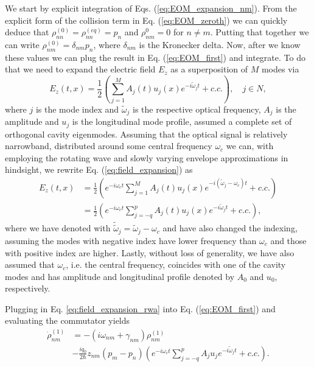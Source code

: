 \documentclass[preprint,secnumarabic,amssymb, nobibnotes, aip, prd]{revtex4-1}
\def\tw{\tilde{\omega}}
\def\tw{\tilde{\omega}}
\begin{document}
	We start by explicit integration of Eqs. (\ref{eq:EOM_expansion_nm}). From the explicit form of the collision term in Eq. (\ref{eq:EOM_zeroth}) we can quickly deduce that $\rho_{nn}^{(0)} = \rho_{nn}^{(eq)} = p_n$ and $\rho_{nm}^{0} = 0$ for $n\neq m$. Putting that together we can write $\rho_{nm}^{(0)} = \delta_{nm}p_n $, where $\delta_{nm}$ is the Kronecker delta. Now, after we know these values we can plug the result in Eq. (\ref{eq:EOM_first}) and integrate. To do that we need to expand the electric field $E_z$ as a superposition of $M$ modes via
	\begin{equation}
	\label{eq:field_expansion}
	E_z(t,x) = \frac{1}{2}(\sum_{j=1}^{M} A_j(t)u_j(x) e^{-i\tw_j t } + c.c.), \quad j \in N,
	\end{equation}
	where $j$ is the mode index and $\tw_j$  is the respective optical frequency, $A_j$ is the amplitude and $u_j$ is the longitudinal mode profile, assumed a complete set of orthogonal cavity eigenmodes. Assuming that the optical signal is relatively narrowband, distributed around some central frequency $\omega_c$ we can, with employing the rotating wave and slowly varying envelope approximations in hindsight, we rewrite Eq. (\ref{eq:field_expansion}) as 
	\begin{align}
	\label{eq:field_expansion_rwa}
	E_z(t,x) &= \frac{1}{2}(e^{-i\omega_c t}\sum_{j=1}^{M} A_j(t)u_j(x) e^{-i(\tw_j-\omega_c) t } + c.c.) \nonumber \\
	&= \frac{1}{2}(e^{-i\omega_c t}\sum_{j=-q}^{p} A_j(t)u_j(x) e^{-i\tw_j t } + c.c.), 
	\end{align}
	where we have denoted with $\tilde \tw_j = \tw_j-\omega_c$ and have also changed the indexing, assuming the modes with negative index have lower frequency than $\omega_c$ and those with positive index are higher. Lastly, without loss of generality, we have also assumed that $\omega_c$, i.e. the central frequency, coincides with one of the cavity modes and has amplitude and longitudinal profile denoted by $A_0$ and $u_0$, respectively.   
	
	Plugging in Eq. \ref{eq:field_expansion_rwa} into Eq. (\ref{eq:EOM_first}) and evaluating the commutator yields
	\begin{align}
	\label{eq:coherence_expansion}
	\dot{\rho}_{nm}^{(1)} &= -(i\omega_{nm}+\gamma_{nm})\rho_{nm}^{(1)}  \nonumber \\ 
	&- \frac{iq_0}{2\hbar}z_{nm}(p_m-p_n)(e^{-i\omega_c t}\sum_{j=-q}^{p}A_ju_je^{-i\tw_j t} + c.c.).
	\end{align}
	
\end{document}
